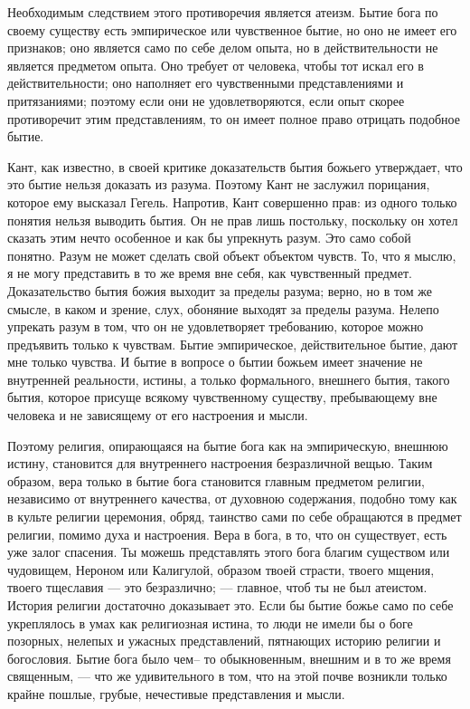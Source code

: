 \documentclass[12pt,oneside]{book}
\begin{document}
Необходимым следствием этого противоречия является атеизм. Бытие бога по своему существу есть эмпирическое или чувственное бытие, но оно не имеет его признаков; оно является само по себе делом опыта, но в действительности не является предметом опыта. Оно требует от человека, чтобы тот искал его в действительности; оно наполняет его чувственными представлениями и притязаниями; поэтому если они не удовлетворяются, если опыт скорее противоречит этим представлениям, то он имеет полное право отрицать подобное бытие.

Кант, как известно, в своей критике доказательств бытия божьего утверждает, что это бытие нельзя доказать из разума. Поэтому Кант не заслужил порицания, которое ему высказал Гегель. Напротив, Кант совершенно прав: из одного только понятия нельзя выводить бытия. Он не прав лишь постольку, поскольку он хотел сказать этим нечто особенное и как бы упрекнуть разум. Это само собой понятно. Разум не может сделать свой объект объектом чувств. То, что я мыслю, я не могу представить в то же время вне себя, как чувственный предмет. Доказательство бытия божия выходит за пределы разума; верно, но в том же смысле, в каком и зрение, слух, обоняние выходят за пределы разума. Нелепо упрекать разум в том, что он не удовлетворяет требованию, которое можно предъявить только к чувствам. Бытие эмпирическое, действительное бытие, дают мне только чувства. И бытие в вопросе о бытии божьем имеет значение не внутренней реальности, истины, а только формального, внешнего бытия, такого бытия, которое присуще всякому чувственному существу, пребывающему вне человека и не зависящему от его настроения и мысли.

Поэтому религия, опирающаяся на бытие бога как на эмпирическую, внешнюю истину, становится для внутреннего настроения безразличной вещью. Таким образом, вера только в бытие бога становится главным предметом религии, независимо от внутреннего качества, от духовною содержания, подобно тому как в культе религии церемония, обряд, таинство сами по себе обращаются в предмет религии, помимо духа и настроения. Вера в бога, в то, что он существует, есть уже залог спасения. Ты можешь представлять этого бога благим существом или чудовищем, Нероном или Калигулой, образом твоей страсти, твоего мщения, твоего тщеславия --- это безразлично; --- главное, чтоб ты не был атеистом. История религии достаточно доказывает это. Если бы бытие божье само по себе укреплялось в умах как религиозная истина, то люди не имели бы о боге позорных, нелепых и ужасных представлений, пятнающих историю религии и богословия. Бытие бога было чем– то обыкновенным, внешним и в то же время священным, --- что же удивительного в том, что на этой почве возникли только крайне пошлые, грубые, нечестивые представления и мысли.
\end{document}
